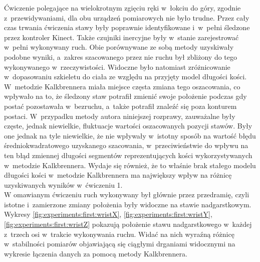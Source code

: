 Ćwiczenie polegające na wielokrotnym zgięciu ręki w~łokciu do góry, zgodnie z~przewidywaniami, dla obu urządzeń pomiarowych nie było trudne. Przez cały czas trwania ćwiczenia stawy były poprawnie identyfikowane i~w~pełni śledzone przez kontroler Kinect. Także czujniki inercyjne były w~stanie zarejestrować w~pełni  wykonywany ruch. Obie porównywane ze sobą metody uzyskiwały podobne wyniki, a~zakres szacowanego przez nie ruchu był zbliżony do tego wykonywanego w~rzeczywistości. Widoczne było natomiast zróżnicowanie w~dopasowaniu szkieletu do ciała ze względu na przyjęty model długości kości. W~metodzie Kalkbrennera miała miejsce częsta zmiana tego oszacowania, co wpływało na to, że śledzony staw potrafił zmienić swoje położenie podczas gdy postać pozostawała w~bezruchu, a~także potrafił znaleźć się poza konturem postaci. W~przypadku metody autora niniejszej rozprawy, zauważalne były częste, jednak niewielkie, fluktuacje wartości oszacowanych pozycji stawów. Były one jednak na tyle niewielkie, że nie wpływały w~istotny sposób na wartość błędu średniokwadratowego uzyskanego szacowania, w~przeciwieństwie do wpływu na ten błąd zmiennej długości segmentów reprezentujących kości wykorzystywanych w~metodzie Kalkbrennera. Wydaje się również, że to właśnie brak stałego modelu długości kości w~metodzie Kalkbrennera ma największy wpływ na różnicę uzyskiwanych wyników w~ćwiczeniu 1. \\
						
W omawianym ćwiczeniu ruch wykonywany był głównie przez przedramię, czyli istotne i~zamierzone zmiany położenia były widoczne na stawie nadgarstkowym. Wykresy \ref{fig:experiments:first:wristX}, \ref{fig:experiments:first:wristY}, \ref{fig:experiments:first:wristZ} pokazują położenie stawu nadgarstkowego w~każdej z~trzech osi w~trakcie wykonywania ruchu. Widać na nich wyraźną różnicę w~stabilności pomiarów objawiającą się ciągłymi drganiami widocznymi na wykresie łączenia danych za pomocą metody Kalkbrennera.
					
